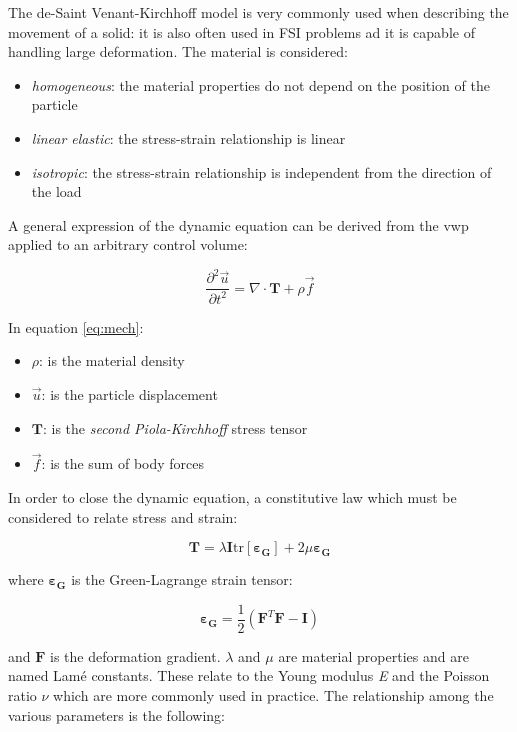 The  de-Saint Venant-Kirchhoff model \cite{ogden1997non} is very commonly used when describing the movement of a solid: it is also often used in FSI problems ad it is capable of handling large deformation. The material is considered:

\begin{itemize}
	\item \textit{homogeneous}: the material properties do not depend on the position of the particle
	\item \textit{linear elastic}: the stress-strain relationship is linear
	\item \textit{isotropic}: the stress-strain relationship is independent from the direction of the load
\end{itemize}

A general expression of the dynamic equation can be derived from the \acrfull{vwp} applied to an arbitrary control volume: 

\begin{equation}
	\label{eq:mech}
	\frac{\partial^2 \vec{u} }{\partial t^2} = \nabla \cdot \mathbf{T} + \rho \vec{f}
\end{equation}

In equation \ref{eq:mech}:

\begin{itemize}
	\item $\rho$: is the material density
	\item $\vec{u}$: is the particle displacement
	\item $\mathbf{T}$: is the \textit{second Piola-Kirchhoff} stress tensor
	\item $\vec{f}$: is the sum of body forces
\end{itemize}


In order to close the dynamic equation, a constitutive law which must be considered to relate stress and strain:

\begin{equation}
	\mathbf{T} = \lambda \mathbf{I} \mathrm{tr}\left[ \bm{\varepsilon_G}  \right]  + 2\mu \bm{\varepsilon_G}
\end{equation}

where $\bm{\varepsilon_G}$ is the Green-Lagrange strain tensor:

\begin{equation}
	\bm{\varepsilon_G} = \frac{1}{2}\left( \mathbf{F}^T \mathbf{F}-\mathbf{I}  \right)
\end{equation}

and $\mathbf{F}$ is the deformation gradient. $\lambda$ and $\mu$ are material properties and are named Lamé constants. These relate to the Young modulus \textit{E} and the Poisson ratio $\nu$ which are more commonly used in practice. The relationship among the various parameters is the following:


